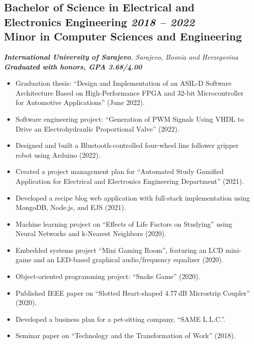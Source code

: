 \subsection*{\textbf{Bachelor of Science in Electrical and Electronics Engineering} \hfill \textit{2018 -- 2022}\\
Minor in Computer Sciences and Engineering}  
\noindent\textit{\textbf{International University of Sarajevo}, Sarajevo, Bosnia and Herzegovina} \\  
\noindent\textit{\textbf{Graduated with honors, GPA 3.68/4.00}} 
\begin{itemize}[leftmargin=*,noitemsep,topsep=3pt]
    \item Graduation thesis: \enquote{Design and Implementation of an ASIL-D Software Architecture Based on High-Performance FPGA and 32-bit Microcontroller for Automotive Applications} (June 2022).
    \item Software engineering project: \enquote{Generation of PWM Signals Using VHDL to Drive an Electrohydraulic Proportional Valve} (2022).
    \item Designed and built a Bluetooth-controlled four-wheel line follower gripper robot using Arduino (2022).
    \item Created a project management plan for \enquote{Automated Study Gamified Application for Electrical and Electronics Engineering Department} (2021).
    \item Developed a recipe blog web application with full-stack implementation using MongoDB, Node.js, and EJS (2021).
    \item Machine learning project on \enquote{Effects of Life Factors on Studying} using Neural Networks and k-Nearest Neighbors (2020).
    \item Embedded systems project \enquote{Mini Gaming Room}, featuring an LCD mini-game and an LED-based graphical audio/frequency equalizer (2020).
    \item Object-oriented programming project: \enquote{Snake Game} (2020).
    \item Published IEEE paper on \enquote{Slotted Heart-shaped 4.77\,dB Microstrip Coupler} (2020).
    \item Developed a business plan for a pet-sitting company, \enquote{SAME L.L.C.}.
    \item Seminar paper on \enquote{Technology and the Transformation of Work} (2018).
\end{itemize}
\vspace{20pt}

